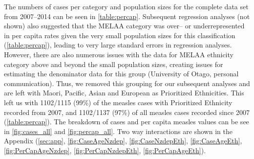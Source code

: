 \documentclass{article}
\begin{document}
The numbers of cases per category and population sizes for the complete data set from 2007--2014 can be seen in \autoref{table:percap}. Subsequent regression analyses (not shown) also suggested that the MELAA category was over-- or underrepresented in per capita rates given the very small population sizes for this classification (\autoref{table:percap}), leading to very large standard errors in regression analyses. However, there are also numerous issues with the data for MELAA ethnicity category above and beyond the small population sizes, creating issues for estimating the denominator data for this group (University of Otago, personal communication). Thus, we removed this grouping for our subsequent analyses and are left with Maori, Pacific, Asian and European as Prioritized Ethnicities. This left us with 1102/1115 (99\%) of the measles cases with Prioritized Ethnicity recorded from 2007, and 1102/1137 (97\%) of all measles cases recorded since 2007 (\autoref{table:percap}). The breakdown of cases and per capita measles values can be see in \autoref{fig:cases_all} and \autoref{fig:percap_all}. Two way interactions are shown in the Appendix (\autoref{sec:app}, \autoref{fig:CaseAgeNzdep}, \autoref{fig:CaseNzdepEth}, \autoref{fig:CaseAgeEth}, \autoref{fig:PerCapAgeNzdep}, \autoref{fig:PerCapNzdepEth}, \autoref{fig:PerCapAgeEth}).
\end{document}
